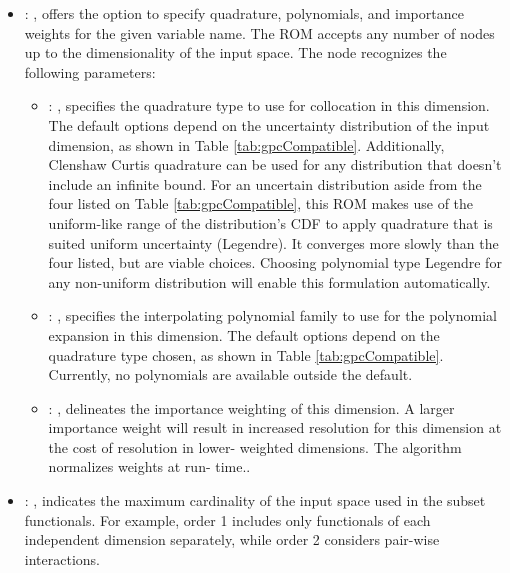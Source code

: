 \begin{itemize}
    \item {}: , 
      offers the option to specify quadrature, polynomials, and importance weights for the given
      variable name.  The ROM accepts any number of  nodes up to the
      dimensionality of the input space.
      The  node recognizes the following parameters:
        \begin{itemize}
          \item {}: , 
            specifies the quadrature type to use for collocation in this dimension.  The default
            options                   depend on the uncertainty distribution of the input dimension,
            as shown in Table                   \ref{tab:gpcCompatible}. Additionally, Clenshaw
            Curtis quadrature can be used for any                   distribution that doesn't
            include an infinite bound.                                      \nb For an uncertain distribution aside from
            the four listed on Table                   \ref{tab:gpcCompatible}, this ROM
            makes use of the uniform-like range of the distribution's CDF to apply quadrature that
            is                   suited uniform uncertainty (Legendre).  It converges more slowly
            than the four listed, but are                   viable choices.  Choosing polynomial
            type Legendre for any non-uniform distribution will                   enable this
            formulation automatically.
          \item {}: , 
            specifies the interpolating polynomial family to use for the polynomial expansion in
            this                   dimension.  The default options depend on the quadrature type
            chosen, as shown in Table                   \ref{tab:gpcCompatible}.  Currently, no
            polynomials are available outside the                   default. 
          \item {}: , 
            delineates the importance weighting of this dimension.  A larger importance weight will
            result in increased resolution for this dimension at the cost of resolution in lower-
            weighted                   dimensions.  The algorithm normalizes weights at run-
            time..
      \end{itemize}

    \item {}: , 
      indicates the maximum cardinality of the input space used in the subset functionals.  For
      example, order 1                                                  includes only functionals of
      each independent dimension separately, while order 2 considers pair-wise interactions.
  \end{itemize}

